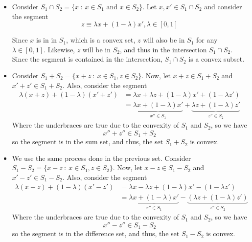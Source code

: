 \documentclass[11pt,table]{article}
\begin{document}
\begin{itemize}
  \item Consider \(S_{1} \cap S_{2}  =  \{x \ : \ x \in S_{1} \text{ and } x \in S_{2}\}\). Let \(x,x' \in S_1 \cap S_2\) and consider the segment
        \[
          z \equiv \lambda x + (1-\lambda)x', \lambda \in [0,1]
        \]

        Since \(x\) is in in \(S_1\), which is a convex set, \(z\) will also be in \(S_1\) for any \(\lambda \in [0,1]\). Likewise, \(z\) will be in \(S_2\), and thus in the intersection \(S_{1} \cap S_{2}\). Since the segment is contained in the intersection, \(S_{1} \cap S_{2}\) is a convex subset.

  \item Consider \(S_{1} + S_{2}  =  \{x + z \ : \ x \in S_{1}, z \in S_{2}\}\). Now, let \(x+z \in S_1 + S_2\) and \(x'+z' \in S_1+S_2\). Also, consider the segment
        \begin{align*}
          \lambda(x+z) + (1-\lambda)(x'+z') & = \lambda x + \lambda z + (1-\lambda)x' + (1-\lambda z')                                                     \\
                                            & = \underbrace{\lambda x +(1-\lambda)x'}_{x'' \in S_1} + \underbrace{\lambda z + (1-\lambda)z'}_{z'' \in S_2}
        \end{align*}
        Where the underbraces are true due to the convexity of \(S_1\) and \(S_2\), so we have
        \[
          x'' + z'' \in S_1 + S_2
        \]
        so the segment is in the sum set, and thus, the set \(S_1 + S_2\) is convex.

  \item We use the same process done in the previous set. Consider \(S_{1} - S_{2}  =  \{x - z \ : \ x \in S_{1}, z \in S_{2}\}\). Now, let \(x-z \in S_1 - S_2\) and \(x'-z' \in S_1-S_2\). Also, consider the segment
        \begin{align*}
          \lambda(x-z) + (1-\lambda)(x'-z') & = \lambda x - \lambda z + (1-\lambda)x' - (1-\lambda z')                                                                   \\
                                            & = \underbrace{\lambda x +(1-\lambda)x'}_{x'' \in S_1} - \underbrace{\left( \lambda z + (1-\lambda)z'\right)}_{z'' \in S_2}
        \end{align*}
        Where the underbraces are true due to the convexity of \(S_1\) and \(S_2\), so we have
        \[
          x'' - z'' \in S_1 - S_2
        \]
        so the segment is in the difference set, and thus, the set \(S_1 - S_2\) is convex.
\end{itemize}
\end{document}
